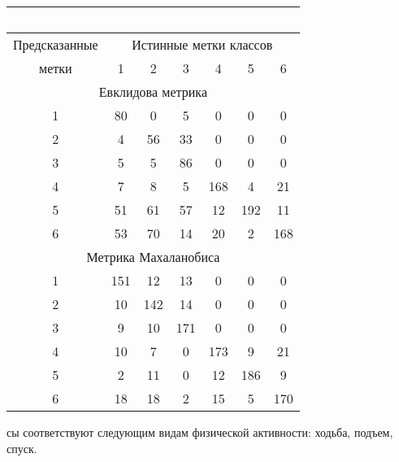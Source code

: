 \begin{multicols}{2}
\begin{center}
{\small 
\tabcolsep=4pt
\begin{tabular}{|c|c|c|c|c|c|c|}
\multicolumn{7}{c}{\ }\\[-6pt]
    \hline
 Предсказанные& \multicolumn{6}{c|}{Истинные метки классов}\\
  \cline{2-7}
   метки& 1  & 2  & 3  & 4  & 5  & 6  \\ 
   \hline
   \multicolumn{7}{|c|}{Евклидова метрика}\\
   \hline
1  & 80\hphantom{9} & \hphantom{9}0  & \hphantom{9}5  & \hphantom{9}0  & \hphantom{9}0  & \hphantom{9}0   \\
2  & 4  & 56 & 33 & \hphantom{9}0  & \hphantom{9}0  & \hphantom{9}0  \\
3  & 5  & \hphantom{9}5  & 86 & \hphantom{9}0  & \hphantom{9}0  & \hphantom{9}0\\
4  & 7  & \hphantom{9}8  & \hphantom{9}5  & 168\hphantom{9}& \hphantom{9}4  & 21 \\
5  & 51\hphantom{9} & 61 & 57 & 12 & 192\hphantom{9}& 11 \\
6  & 53\hphantom{9} & 70 & 14 & 20 & \hphantom{9}2  & 168\hphantom{9}\\
\hline
\multicolumn{7}{|c|}{Метрика Махаланобиса}\\
\hline
1& 151\hphantom{9} & 12 & 13    & \hphantom{9}0     & \hphantom{9}0    & \hphantom{9}0 \\ 
  2  & 10  & 142\hphantom{9}& 14    & \hphantom{9}0     & \hphantom{9}0    & \hphantom{9}0 \\ 
  3  & \hphantom{9}9   & 10 & 171\hphantom{9}   & \hphantom{9}0     & \hphantom{9}0    & \hphantom{9}0 \\
   4  & 10  & \hphantom{9}7  & \hphantom{9}0     & 173\hphantom{9}   & \hphantom{9}9    & 21\\  
     5  & \hphantom{9}2   & 11 & \hphantom{9}0     & 12    & 186\hphantom{9}  & \hphantom{9}9 \\ 
       6  & 18  & 18 & \hphantom{9}2     & 15    & \hphantom{9}5    & 170\hphantom{9}\\ 
\hline
\end{tabular}}
\end{center} 

 \vspace*{9pt}
 
 \noindent
 сы соответствуют следующим видам физической активности: ходьба, 
подъем, спуск.





\end{multicols}
